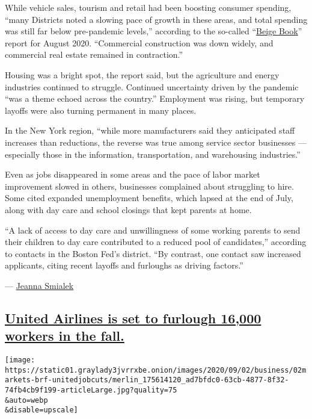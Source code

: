 While vehicle sales, tourism and retail had been boosting consumer
spending, ``many Districts noted a slowing pace of growth in these
areas, and total spending was still far below pre-pandemic levels,''
according to the so-called
``\href{https://www.federalreserve.gov/monetarypolicy/files/BeigeBook_20200902.pdf}{Beige
Book}'' report for August 2020. ``Commercial construction was down
widely, and commercial real estate remained in contraction.''

Housing was a bright spot, the report said, but the agriculture and
energy industries continued to struggle. Continued uncertainty driven by
the pandemic ``was a theme echoed across the country.'' Employment was
rising, but temporary layoffs were also turning permanent in many
places.

In the New York region, ``while more manufacturers said they anticipated
staff increases than reductions, the reverse was true among service
sector businesses --- especially those in the information,
transportation, and warehousing industries.''

Even as jobs disappeared in some areas and the pace of labor market
improvement slowed in others, businesses complained about struggling to
hire. Some cited expanded unemployment benefits, which lapsed at the end
of July, along with day care and school closings that kept parents at
home.

``A lack of access to day care and unwillingness of some working parents
to send their children to day care contributed to a reduced pool of
candidates,'' according to contacts in the Boston Fed's district. ``By
contrast, one contact saw increased applicants, citing recent layoffs
and furloughs as driving factors.''

--- \href{https://www.nytimes3xbfgragh.onion/by/jeanna-smialek}{Jeanna
Smialek}

\hypertarget{united-airlines-is-set-to-furlough-16000-workers-in-the-fall}{%
\subsection{\texorpdfstring{\protect\hyperlink{united-airlines-is-set-to-furlough-16000-workers-in-the-fall}{United
Airlines is set to furlough 16,000 workers in the
fall.}}{United Airlines is set to furlough 16,000 workers in the fall.}}\label{united-airlines-is-set-to-furlough-16000-workers-in-the-fall}}

\texttt{[image: https://static01.graylady3jvrrxbe.onion/images/2020/09/02/business/02markets-brf-unitedjobcuts/merlin\_175614120\_ad7bfdc0-63cb-4877-8f32-74fb4cb9f199-articleLarge.jpg?quality=75\\\&auto=webp\\\&disable=upscale]}

